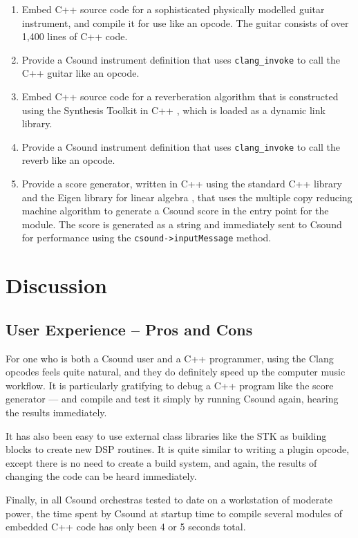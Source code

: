 \documentclass[letterpaper, 12pt]{article}
\begin{document}
\begin{enumerate}
\item Embed C++ source code for a sophisticated physically modelled guitar instrument, and compile it for use like an opcode. The guitar consists of over 1,400 lines of C++ code.
\item Provide a Csound instrument definition that uses \verb|clang_invoke| to call the C++ guitar like an opcode.
\item Embed C++ source code for a reverberation algorithm that is constructed using the Synthesis Toolkit in C++ \citep{thestk, stkbook}, which is loaded as a dynamic link library.
\item Provide a Csound instrument definition that uses \verb|clang_invoke| to call the reverb like an opcode.
\item Provide a score generator, written in C++ using the standard C++ library and the Eigen library for linear algebra \citep{eigen3}, that uses the multiple copy reducing machine algorithm \citep{chaosandfractals} to generate a Csound score in the entry point for the module. The score is generated as a string and immediately sent to Csound for performance using the \verb|csound->inputMessage| method.
\end{enumerate}

\section{Discussion}

\subsection{User Experience -- Pros and Cons}

For one who is both a Csound user and a C++ programmer, using the Clang opcodes feels quite natural, and they do definitely speed up the computer music workflow. It is particularly gratifying to debug a C++ program like the score generator --- and compile and test it simply by running Csound again, hearing the results immediately.

It has also been easy to use external class libraries like the STK \citep{thestk} as building blocks to create new DSP routines. It is quite similar to writing a plugin opcode, except  there is no need to create a build system, and again, the results of changing the code can be heard immediately.

Finally, in all Csound orchestras tested to date on a workstation of moderate power, the time spent by Csound at startup time to compile several modules of embedded C++ code has only been 4 or 5 seconds total.
\end{document}
